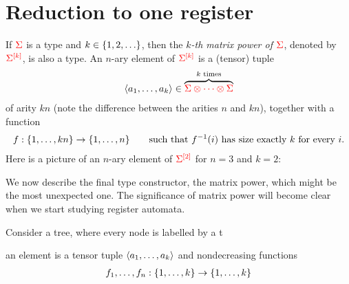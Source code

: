 \section{Reduction to one register}
\label{sec:matrix-power}


\begin{definition}
    If  ${\color{red}{\Sigma}}$ is a type and $k \in \{1,2,\ldots\}$, then the \emph{$k$-th matrix power of ${\color{red}{\Sigma}}$}, denoted by ${\color{red}{\Sigma^{[k]}}}$, is also a type.  An $n$-ary element of ${\color{red}{\Sigma^{[k]}}}$ is a (tensor) tuple
    \begin{align*}
        \langle{a_1,\ldots,a_k}\rangle \in \overbrace{{\color{red}{\Sigma \otimes \cdots \otimes \Sigma}}}^{\text{$k$ times}} 
    \end{align*}
    of arity $kn$ (note the difference between the arities $n$ and $kn$), together with a function
    \begin{align*}
        f : \{1,\ldots,kn\} \to \{1,\ldots,n\} \qquad \text{such that $f^{-1}(i)$ has size exactly $k$ for every $i$.}
    \end{align*}
    Here is a picture of an $n$-ary element of  ${\color{red}{\Sigma^{[2]}}}$ for $n=3$ and $k=2$:
\end{definition}
  
We now describe the final type constructor, the matrix power, which might be the most unexpected one. The significance of matrix power will become clear when we start studying register automata.  

Consider a tree, where every node is labelled by a t

an element is a tensor tuple $\langle{a_1,\ldots,a_k}\rangle$ and nondecreasing functions 
\begin{align*}
    f_1,\ldots,f_n : \{1,\ldots,k\} \to \{1,\ldots,k\}
\end{align*}

